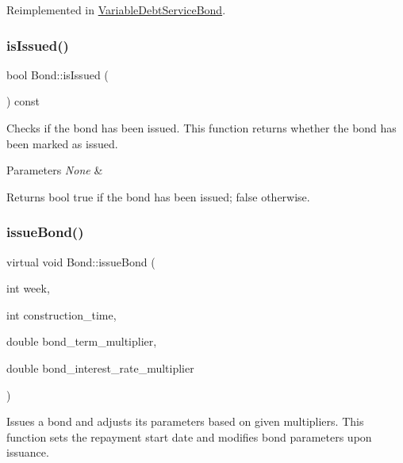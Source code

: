 Reimplemented in \mbox{\hyperlink{classVariableDebtServiceBond_a3edee29f26e8ac74f9767770c6a951c9}{Variable\+Debt\+Service\+Bond}}.

\mbox{\label{classBond_a6342f3dd3295771b71ac1fcc3b666a42}} 
\subsubsection{\texorpdfstring{is\+Issued()}{isIssued()}}
{\footnotesize\ttfamily bool Bond\+::is\+Issued (\begin{DoxyParamCaption}{ }\end{DoxyParamCaption}) const}



Checks if the bond has been issued. This function returns whether the bond has been marked as issued. 


\begin{DoxyParams}{Parameters}
{\em None} & \\
\hline
\end{DoxyParams}
\begin{DoxyReturn}{Returns}
bool {\ttfamily true} if the bond has been issued; {\ttfamily false} otherwise. 
\end{DoxyReturn}
\mbox{\label{classBond_a726edbe3ea7047ebc7246585943763e3}} 
\subsubsection{\texorpdfstring{issue\+Bond()}{issueBond()}}
{\footnotesize\ttfamily virtual void Bond\+::issue\+Bond (\begin{DoxyParamCaption}\item[{int}]{week,  }\item[{int}]{construction\+\_\+time,  }\item[{double}]{bond\+\_\+term\+\_\+multiplier,  }\item[{double}]{bond\+\_\+interest\+\_\+rate\+\_\+multiplier }\end{DoxyParamCaption})\hspace{0.3cm}{\ttfamily [virtual]}}



Issues a bond and adjusts its parameters based on given multipliers. This function sets the repayment start date and modifies bond parameters upon issuance. 


